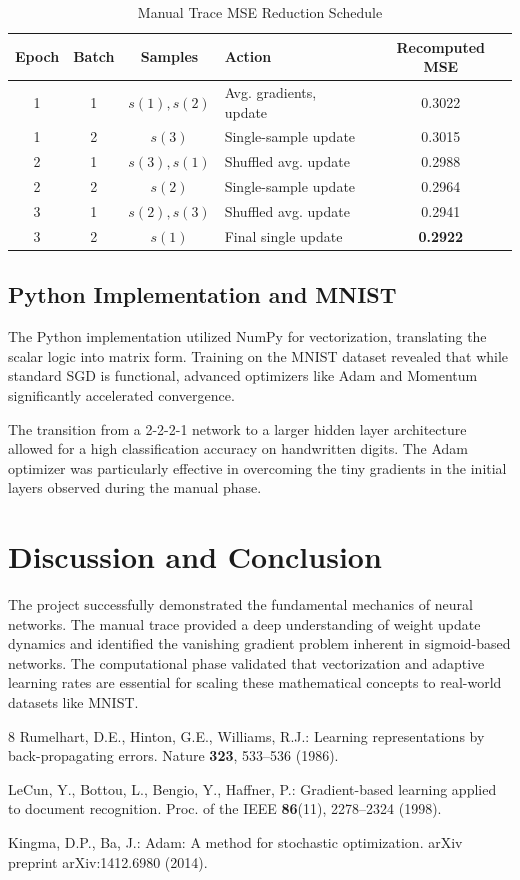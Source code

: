 \documentclass[runningheads]{llncs}
\begin{document}
\begin{table}[h]
\centering
\caption{Manual Trace MSE Reduction Schedule}
\label{tab:manual_mse}
\begin{tabular}{|c|c|c|l|c|}
\hline
\textbf{Epoch} & \textbf{Batch} & \textbf{Samples} & \textbf{Action} & \textbf{Recomputed MSE} \\ \hline
1 & 1 & $s(1), s(2)$ & Avg. gradients, update & 0.3022 \\ \hline
1 & 2 & $s(3)$ & Single-sample update & 0.3015 \\ \hline
2 & 1 & $s(3), s(1)$ & Shuffled avg. update & 0.2988 \\ \hline
2 & 2 & $s(2)$ & Single-sample update & 0.2964 \\ \hline
3 & 1 & $s(2), s(3)$ & Shuffled avg. update & 0.2941 \\ \hline
3 & 2 & $s(1)$ & Final single update & \textbf{0.2922} \\ \hline
\end{tabular}
\end{table}

\subsection{Python Implementation and MNIST}
The Python implementation utilized NumPy for vectorization, translating the scalar logic into matrix form. Training on the MNIST dataset revealed that while standard SGD is functional, advanced optimizers like Adam and Momentum significantly accelerated convergence. 

The transition from a 2-2-2-1 network to a larger hidden layer architecture allowed for a high classification accuracy on handwritten digits. The Adam optimizer was particularly effective in overcoming the tiny gradients in the initial layers observed during the manual phase.

\section{Discussion and Conclusion}
The project successfully demonstrated the fundamental mechanics of neural networks. The manual trace provided a deep understanding of weight update dynamics and identified the vanishing gradient problem inherent in sigmoid-based networks. The computational phase validated that vectorization and adaptive learning rates are essential for scaling these mathematical concepts to real-world datasets like MNIST.

\begin{thebibliography}{8}
Rumelhart, D.E., Hinton, G.E., Williams, R.J.: Learning representations by back-propagating errors. Nature \textbf{323}, 533--536 (1986).

LeCun, Y., Bottou, L., Bengio, Y., Haffner, P.: Gradient-based learning applied to document recognition. Proc. of the IEEE \textbf{86}(11), 2278--2324 (1998).

Kingma, D.P., Ba, J.: Adam: A method for stochastic optimization. arXiv preprint arXiv:1412.6980 (2014).
\end{thebibliography}
\end{document}
